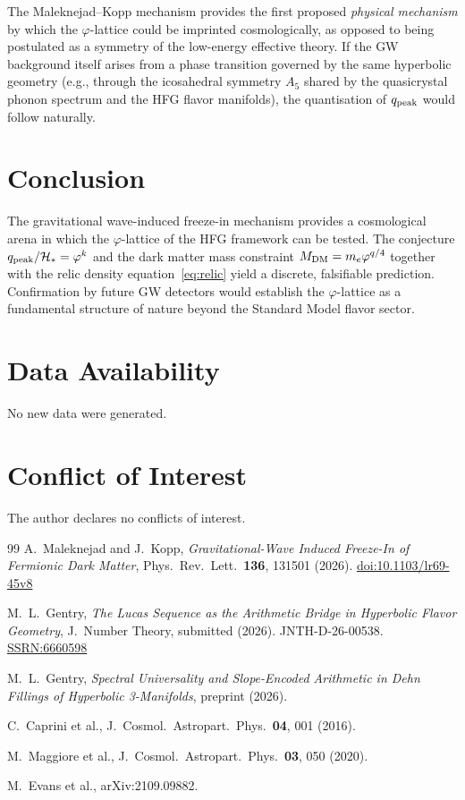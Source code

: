 \documentclass[12pt]{article}
\theoremstyle{definition}
\newcommand{\ph}{\varphi}
\newcommand{\Hstar}{\mathcal{H}_*}
\begin{document}
The Maleknejad--Kopp mechanism provides the first proposed \emph{physical
mechanism} by which the $\ph$-lattice could be imprinted cosmologically,
as opposed to being postulated as a symmetry of the low-energy effective
theory. If the GW background itself arises from a phase transition
governed by the same hyperbolic geometry (e.g., through the icosahedral
symmetry $A_5$ shared by the quasicrystal phonon spectrum and the HFG
flavor manifolds), the quantisation of $q_{\rm peak}$ would follow
naturally.

\section{Conclusion}

The gravitational wave-induced freeze-in mechanism provides a
cosmological arena in which the $\ph$-lattice of the HFG framework
can be tested. The conjecture $q_{\rm peak}/\Hstar = \ph^k$ and the
dark matter mass constraint $M_{\rm DM} = m_e\ph^{q/4}$ together
with the relic density equation~\eqref{eq:relic} yield a discrete,
falsifiable prediction. Confirmation by future GW detectors would
establish the $\ph$-lattice as a fundamental structure of nature
beyond the Standard Model flavor sector.

\section*{Data Availability}
No new data were generated.

\section*{Conflict of Interest}
The author declares no conflicts of interest.

\begin{thebibliography}{99}
A.~Maleknejad and J.~Kopp,
\textit{Gravitational-Wave Induced Freeze-In of Fermionic Dark Matter},
Phys.\ Rev.\ Lett.\ \textbf{136}, 131501 (2026).
\href{https://doi.org/10.1103/lr69-45v8}{doi:10.1103/lr69-45v8}

M.~L.~Gentry,
\textit{The Lucas Sequence as the Arithmetic Bridge in Hyperbolic Flavor Geometry},
J.\ Number Theory, submitted (2026). JNTH-D-26-00538.
\href{https://doi.org/10.2139/ssrn.6660598}{SSRN:6660598}

M.~L.~Gentry,
\textit{Spectral Universality and Slope-Encoded Arithmetic in Dehn Fillings of Hyperbolic 3-Manifolds},
preprint (2026).

C.~Caprini et al.,
J.\ Cosmol.\ Astropart.\ Phys.\ \textbf{04}, 001 (2016).

M.~Maggiore et al.,
J.\ Cosmol.\ Astropart.\ Phys.\ \textbf{03}, 050 (2020).

M.~Evans et al., arXiv:2109.09882.
\end{thebibliography}
\end{document}
